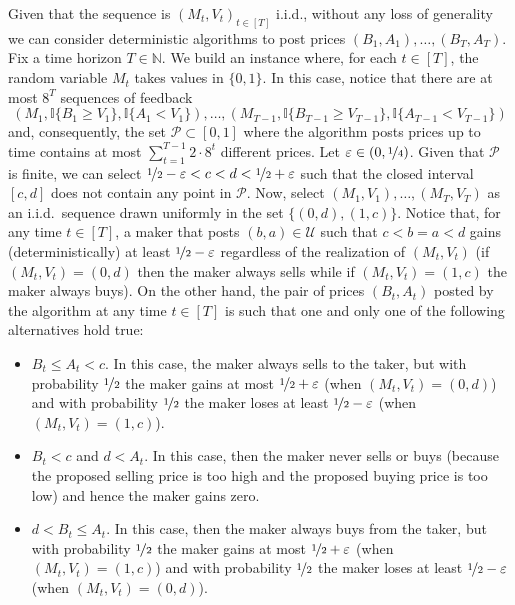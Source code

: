 \documentclass[final,12pt]{colt2025}
\newcommand{\cP}{\mathcal{P}}
\newcommand{\cU}{\mathcal{U}}
\newcommand{\N}{\mathbb{N}}
\newcommand{\e}{\varepsilon}
\newcommand{\one}[1]{\mathbb{I}\{#1\}}
\newcommand{\itemm}{\item[$\bullet$]}
\newcommand{\nP}{M}
\newcommand{\nZ}{V}
\newcommand{\nB}{B}
\newcommand{\nb}{b}
\newcommand{\nS}{A}
\newcommand{\ns}{a}
\begin{document}
    Given that the sequence is $(\nP_t,\nZ_t)_{t \in [T]}$ i.i.d., without any loss of generality we can consider deterministic algorithms to post prices $(\nB_1, \nS_1), \dots, (\nB_T, \nS_T)$.
    Fix a time horizon $T \in \N$.
    We build an instance where, for each $t \in [T]$, the random variable $\nP_t$ takes values in $\{0,1\}$.
    In this case, notice that there are at most $8^{T}$ sequences of feedback
    $$
        (\nP_1, \one{ \nB_1 \ge \nZ_1 }, \one{ \nS_1 < \nZ_1 }),
        \dots,
        (\nP_{T-1}, \one{ \nB_{T-1} \ge \nZ_{T-1} }, \one{ \nS_{T-1} < \nZ_{T-1} })
    $$
    and, consequently, the set $\cP \subset [0,1]$ where the algorithm posts prices up to time contains at most $\sum_{t=1}^{T-1} 2 \cdot 8^{t}$ different prices.
    Let $\e \in (0, \nicefrac{1}{4})$.
    Given that $\cP$ is finite, we can select $\nicefrac{1}{2}-\e < c<d < \nicefrac{1}{2}+\e$ such that the closed interval $[c,d]$ does not contain any point in $\cP$.
    Now, select $(\nP_1,\nZ_1),\dots,(\nP_T,\nZ_T)$ as an i.i.d.\ sequence drawn uniformly in the set $\{(0,d),(1,c)\}$.
    Notice that, for any time $t \in [T]$, a maker that posts $(\nb, \ns) \in \cU$ such that $c < \nb = \ns < d$ gains (deterministically) at least $\nicefrac{1}{2} - \e$ regardless of the realization of $(\nP_t,\nZ_t)$ (if $(\nP_t,\nZ_t) = (0,d)$ then the maker always sells while if $(\nP_t,\nZ_t) = (1,c)$ the maker always buys).
    On the other hand, the pair of prices $(\nB_t,\nS_t)$ posted by the algorithm at any time $t \in [T]$ is such that one and only one of the following alternatives hold true:
    \begin{itemize}
        \itemm $\nB_t \le \nS_t < c$. In this case, the maker always sells to the taker, but with probability $\nicefrac{1}{2}$ the maker gains at most $\nicefrac{1}{2} + \e$ (when $(\nP_t,\nZ_t) = (0,d)$) and with probability $\nicefrac{1}{2}$ the maker loses at least $\nicefrac{1}{2} - \e$ (when $(\nP_t,\nZ_t) = (1,c)$).
        \itemm $\nB_t < c$ and $d < \nS_t$. In this case, then the maker never sells or buys (because the proposed selling price is too high and the proposed buying price is too low) and hence the maker gains zero. 
        \itemm $d < \nB_t \le \nS_t$. In this case, then the maker always buys from the taker, but with probability $\nicefrac{1}{2}$ the maker gains at most $\nicefrac{1}{2} + \e$ (when $(\nP_t,\nZ_t) = (1,c)$) and with probability $\nicefrac{1}{2}$ the maker loses at least $\nicefrac{1}{2} - \e$ (when $(\nP_t,\nZ_t) = (0,d)$). 
    \end{itemize}
\end{document}
